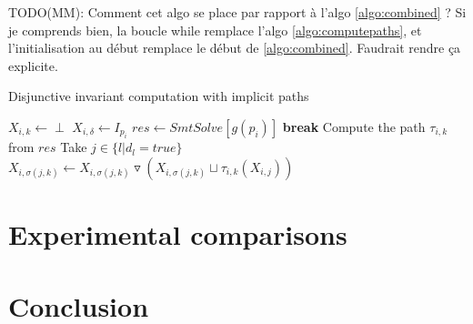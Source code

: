 \documentclass[preprint]{sigplanconf}
\newcommand{\MM}[1]{{\color{blue} TODO(MM): #1}}
\newcommand{\widening}{\mathop{\triangledown}}
\begin{document}
\MM{Comment cet algo se place par rapport à l'algo
  \ref{algo:combined} ? Si je comprends bien, la boucle while
  remplace l'algo \ref{algo:computepaths}, et l'initialisation au
  début remplace le début de \ref{algo:combined}. Faudrait rendre ça
  explicite.}
\begin{algorithm}[!h]
\caption{Disjunctive invariant computation with implicit paths}\label{gulwani2}
\label{algo:disjunctive}
\begin{algorithmic}[1] 
	\STATE $X_{i,k} \gets \perp$
\ENDFOR
\STATE $X_{i,\delta} \gets I_{p_i}$
		\STATE $res \gets SmtSolve\left[g(p_i)\right]$
		\STATE \textbf{break}
	\ENDIF
	\STATE Compute the path $\tau_{i,k}$ from $res$ 
	\STATE Take $j \in \{ l | d_l = true\}$ 
	\STATE $X_{i,\sigma(j,k)} \gets X_{i,\sigma(j,k)} \widening (X_{i,\sigma(j,k)} \sqcup \tau_{i,k}(X_{i,j}))$
\ENDWHILE
\end{algorithmic}
\end{algorithm}

\section{Experimental comparisons}
\label{sec:experiments}

\section{Conclusion}









\end{document}
